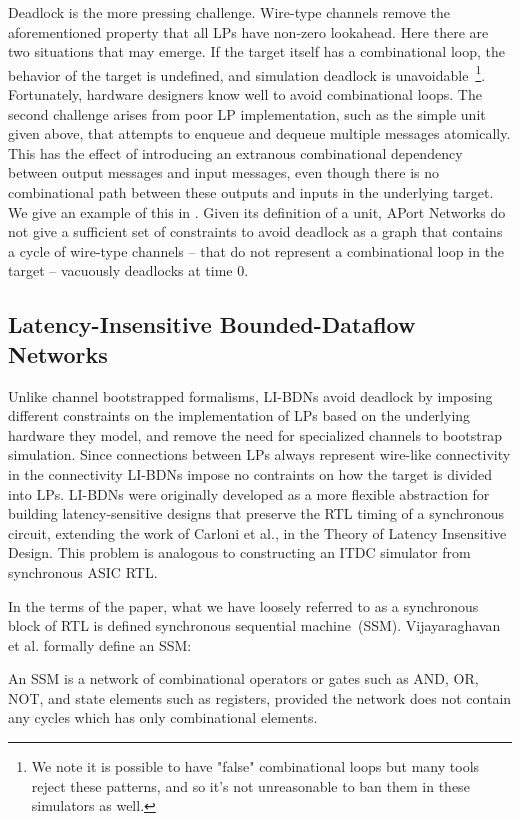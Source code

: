 Deadlock is the more pressing challenge. Wire-type channels remove the
aforementioned property that all LPs have non-zero lookahead.  Here there are
two situations that may emerge. If the target itself has a combinational loop,
the behavior of the target is undefined, and simulation deadlock is
unavoidable~\footnote{We note it is possible to have "false" combinational
loops but many tools reject these patterns, and so it's not unreasonable to ban
them in these simulators as well.}. Fortunately, hardware designers know well
to avoid combinational loops. The second challenge arises from poor LP
implementation, such as the simple unit given above, that attempts to enqueue
and dequeue multiple messages atomically. This has the effect of introducing an
extranous combinational dependency between output messages and input messages,
even though there is no combinational path between these outputs and inputs in
the underlying target. We give an example of this in . Given its
definition of a unit, APort Networks do not give a sufficient set of
constraints to avoid deadlock as a graph that contains a cycle of wire-type
channels -- that do not represent a combinational loop in the target -- vacuously
deadlocks at time 0.


\subsection{Latency-Insensitive Bounded-Dataflow Networks}

Unlike channel bootstrapped formalisms, LI-BDNs avoid deadlock by imposing
different constraints on the implementation of LPs based on the underlying
hardware they model, and remove the need for specialized channels to bootstrap
simulation. Since connections between LPs always represent wire-like
connectivity in the connectivity LI-BDNs impose no contraints on how the target
is divided into LPs. LI-BDNs were originally developed as a more flexible abstraction for building
latency-sensitive designs that preserve the RTL timing of a synchronous circuit, extending
the work of Carloni et al., in the Theory of Latency Insensitive Design. This problem is analogous
to constructing an ITDC simulator from synchronous ASIC RTL.

In the terms of the paper, what we have loosely referred to as a synchronous
block of RTL is defined synchronous sequential machine~(SSM). Vijayaraghavan et
al.\cite{LIBDN} formally define an SSM:

\begin{widequote}
An SSM is a network of combinational operators or gates
such as AND, OR, NOT, and state elements such as registers,
provided the network does not contain any cycles which has
only combinational elements.
\end{widequote}

